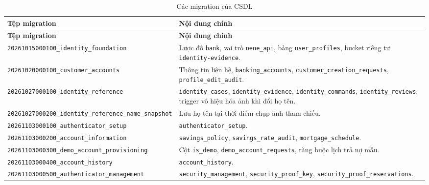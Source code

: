 \begingroup
\footnotesize
\begin{longtable}{@{}>{\raggedright\arraybackslash}p{6.4cm}>{\raggedright\arraybackslash}p{8.0cm}@{}}
	\caption{Các migration của CSDL}
	\label{tab:ch3-migrations}\\
	\toprule
	\textbf{Tệp migration} & \textbf{Nội dung chính}\\
	\midrule
	\endfirsthead
	\toprule
	\textbf{Tệp migration} & \textbf{Nội dung chính}\\
	\midrule
	\endhead
	\bottomrule
	\endlastfoot
	\texttt{20261015000100\_\allowbreak identity\_foundation} & Lược đồ \texttt{bank}, vai trò \texttt{nene\_\allowbreak{}api}, bảng \texttt{user\_\allowbreak{}profiles}, bucket riêng tư \texttt{identity-\allowbreak{}evidence}.\\
	\texttt{20261020000100\_\allowbreak customer\_accounts} & Thông tin liên hệ, \texttt{banking\_\allowbreak{}accounts}, \texttt{customer\_\allowbreak{}creation\_\allowbreak{}requests}, \texttt{profile\_\allowbreak{}edit\_\allowbreak{}audit}.\\
	\texttt{20261027000100\_\allowbreak identity\_reference} & \texttt{identity\_\allowbreak{}cases}, \texttt{identity\_\allowbreak{}evidence}, \texttt{identity\_\allowbreak{}commands}, \texttt{identity\_\allowbreak{}reviews}; trigger vô hiệu hóa ảnh khi đổi họ tên.\\
	\texttt{20261027000200\_\allowbreak identity\_reference\_\allowbreak name\_snapshot} & Lưu họ tên tại thời điểm chụp ảnh tham chiếu.\\
	\texttt{20261103000100\_\allowbreak authenticator\_setup} & \texttt{authenticator\_\allowbreak{}setup}.\\
	\texttt{20261103000200\_\allowbreak account\_information} & \texttt{savings\_\allowbreak{}policy}, \texttt{savings\_\allowbreak{}rate\_\allowbreak{}audit}, \texttt{mortgage\_\allowbreak{}schedule}.\\
	\texttt{20261103000300\_\allowbreak demo\_account\_\allowbreak provisioning} & Cột \texttt{is\_\allowbreak{}demo}, \texttt{demo\_\allowbreak{}account\_\allowbreak{}requests}, ràng buộc lịch trả nợ mẫu.\\
	\texttt{20261103000400\_\allowbreak account\_history} & \texttt{account\_\allowbreak{}history}.\\
	\texttt{20261103000500\_\allowbreak authenticator\_\allowbreak management} & \texttt{security\_\allowbreak{}management}, \texttt{security\_\allowbreak{}proof\_\allowbreak{}key}, \texttt{security\_\allowbreak{}proof\_\allowbreak{}reservations}.\\

\end{longtable}
